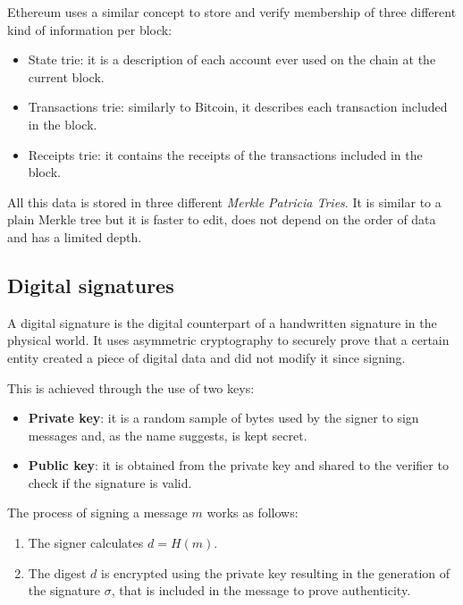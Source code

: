 Ethereum uses a similar concept to store and verify membership of three different kind of information per block: 

\begin{itemize}
    \item State trie: it is a description of each account ever used on the chain at the current block.
    \item Transactions trie: similarly to Bitcoin, it describes each transaction included in the block.
    \item Receipts trie: it contains the receipts of the transactions included in the block.
\end{itemize}

All this data is stored in three different \textit{Merkle Patricia Tries}. It is similar to a plain Merkle tree but it is faster to edit, does not depend on the order of data and has a limited depth.

\subsection{Digital signatures}

A digital signature is the digital counterpart of a handwritten signature in the physical world. It uses asymmetric cryptography to securely prove that a certain entity created a piece of digital data and did not modify it since signing. 

This is achieved through the use of two keys:

\begin{itemize}
    \item \textbf{Private key}: it is a random sample of bytes used by the signer to sign messages and, as the name suggests, is kept secret.
    \item \textbf{Public key}: it is obtained from the private key and shared to the verifier to check if the signature is valid.
\end{itemize}

The process of signing a message $m$ works as follows:

\begin{enumerate}
    \item The signer calculates $d=H(m)$.
    \item The digest $d$ is encrypted using the private key resulting in the generation of the signature $\sigma$, that is included in the message to prove authenticity.
\end{enumerate}

